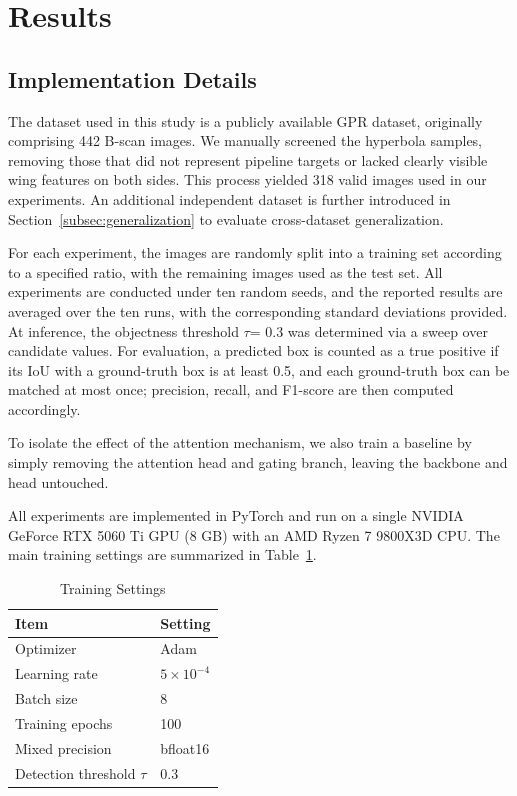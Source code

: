 \documentclass[lettersize,journal]{IEEEtran}
\begin{document}
\section{Results}
\subsection{Implementation Details}
\label{sec:impl}

The dataset used in this study is a publicly available GPR dataset\cite{gpr-hhalx_dataset}, originally comprising 442 B-scan images. We manually screened the hyperbola samples, removing those that did not represent pipeline targets or lacked clearly visible wing features on both sides. This process yielded 318 valid images used in our experiments. An additional independent dataset is further introduced in Section~\ref{subsec:generalization} to evaluate cross-dataset generalization.

For each experiment, the images are randomly split into a training set according to a specified ratio, 
with the remaining images used as the test set. 
All experiments are conducted under ten random seeds, 
and the reported results are averaged over the ten runs,
with the corresponding standard deviations provided.
At inference, the objectness threshold  $\tau$= 0.3 was determined via a sweep over candidate values. 
For evaluation, a predicted box is counted as a true positive if its IoU
with a ground-truth box is at least 0.5, and each ground-truth box can be matched at most once;
precision, recall, and F1-score are then computed accordingly.

To isolate the effect of the attention mechanism, we also train a baseline by simply removing the attention head and gating branch, leaving the backbone and head untouched.

All experiments are implemented in PyTorch and run on a single NVIDIA GeForce RTX 5060 Ti GPU (8 GB)
with an AMD Ryzen 7 9800X3D CPU.
The main training settings are summarized in Table~\ref{tab:impl}.

\begin{table}[]
\caption{Training Settings}
\label{tab:impl}
\centering
\begin{tabular}{ll}
\toprule
Item & Setting \\
\midrule
Optimizer & Adam \\
Learning rate & $5\times10^{-4}$ \\
Batch size & 8 \\
Training epochs & 100 \\
Mixed precision & bfloat16 \\
Detection threshold $\tau$ & 0.3 \\
\bottomrule
\end{tabular}
\end{table}
\end{document}
